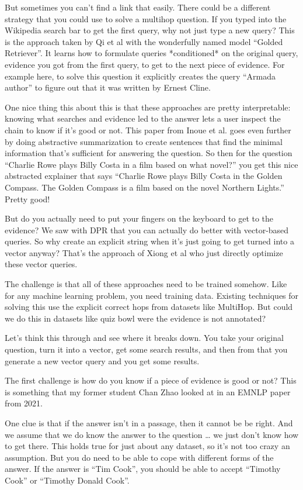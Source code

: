 But sometimes you can’t find a link that easily.  There could be a different strategy that you could use to solve a multihop question.  If you typed into the Wikipedia search bar to get the first query, why not just type a new query?  This is the approach taken by Qi et al with the wonderfully named model “Golded Retriever”.  It learns how to formulate queries *conditioned* on the original query, evidence you got from the first query, to get to the next piece of evidence.  For example here, to solve this question it explicitly creates the query “Armada author” to figure out that it was written by Ernest Cline.

One nice thing this about this is that these approaches are pretty interpretable: knowing what searches and evidence led to the answer lets a user inspect the chain to know if it’s good or not.  This paper from Inoue et al. goes even further by doing abstractive summarization to create sentences that find the minimal information that’s sufficient for answering the question.  So then for the question “Charlie Rowe plays Billy Costa in a film based on what novel?” you get this nice abstracted explainer that says “Charlie Rowe plays Billy Costa in the Golden Compass.  The Golden Compass is a film based on the novel Northern Lights.”  Pretty good!

But do you actually need to put your fingers on the keyboard to get to the evidence?  We saw with DPR that you can actually do better with vector-based queries.  So why create an explicit string when it’s just going to get turned into a vector anyway?  That’s the approach of Xiong et al who just directly optimize these vector queries.

The challenge is that all of these approaches need to be trained somehow.  Like for any machine learning problem, you need training data.  Existing techniques for solving this use the explicit correct hops from datasets like MultiHop.  But could we do this in datasets like quiz bowl were the evidence is not annotated?  

Let’s think this through and see where it breaks down.  You take your original question, turn it into a vector, get some search results, and then from that you generate a new vector query and you get some results.  

The first challenge is how do you know if a piece of evidence is good or not?  This is something that my former student Chan Zhao looked at in an EMNLP paper from 2021.

One clue is that if the answer isn’t in a passage, then it cannot be be right.  And we assume that we do know the answer to the question … we just don’t know how to get there.  This holds true for just about any dataset, so it’s not too crazy an assumption.  But you do need to be able to cope with different forms of the answer.  If the answer is “Tim Cook”, you should be able to accept “Timothy Cook” or “Timothy Donald Cook”.

